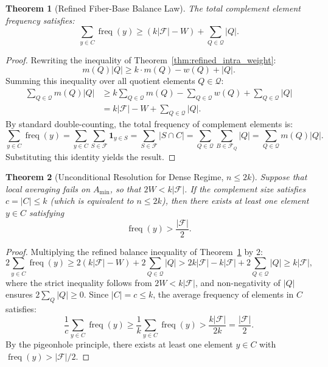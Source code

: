 \documentclass[11pt,a4paper]{article}
\theoremstyle{plain}
\newtheorem{theorem}{Theorem}[section]
\theoremstyle{definition}
\theoremstyle{remark}
\newcommand{\F}{\mathcal{F}}
\newcommand{\Q}{\mathcal{Q}}
\newcommand{\freq}{\operatorname{freq}}
\begin{document}
\begin{theorem}[Refined Fiber-Base Balance Law]\label{thm:fiber_base_balance}
The total complement element frequency satisfies:
\begin{equation}
\sum_{y \in C} \freq(y) \ge (k |\F| - W) + \sum_{Q \in \Q} |Q|.
\end{equation}
\end{theorem}
\begin{proof}
Rewriting the inequality of Theorem~\ref{thm:refined_intra_weight}:
\begin{equation}
m(Q)|Q| \ge k \cdot m(Q) - w(Q) + |Q|.
\end{equation}
Summing this inequality over all quotient elements $Q \in \Q$:
\begin{align}
\sum_{Q \in \Q} m(Q)|Q| &\ge k \sum_{Q \in \Q} m(Q) - \sum_{Q \in \Q} w(Q) + \sum_{Q \in \Q} |Q| \nonumber \\
&= k |\F| - W + \sum_{Q \in \Q} |Q|.
\end{align}
By standard double-counting, the total frequency of complement elements is:
\begin{equation}
\sum_{y \in C} \freq(y) = \sum_{y \in C} \sum_{S \in \F} \mathbf{1}_{y \in S} = \sum_{S \in \F} |S \cap C| = \sum_{Q \in \Q} \sum_{B \in \F_Q} |Q| = \sum_{Q \in \Q} m(Q)|Q|.
\end{equation}
Substituting this identity yields the result.
\end{proof}

\begin{theorem}[Unconditional Resolution for Dense Regime, $n \le 2k$]\label{thm:dense_regime}
Suppose that local averaging fails on $A_{\min}$, so that $2W < k|\F|$. If the complement size satisfies $c = |C| \le k$ (which is equivalent to $n \le 2k$), then there exists at least one element $y \in C$ satisfying
\begin{equation}
\freq(y) > \frac{|\F|}{2}.
\end{equation}
\end{theorem}
\begin{proof}
Multiplying the refined balance inequality of Theorem~\ref{thm:fiber_base_balance} by $2$:
\begin{equation}
2 \sum_{y \in C} \freq(y) \ge 2(k |\F| - W) + 2 \sum_{Q \in \Q} |Q| > 2 k |\F| - k |\F| + 2 \sum_{Q \in \Q} |Q| \ge k |\F|,
\end{equation}
where the strict inequality follows from $2W < k|\F|$, and non-negativity of $|Q|$ ensures $2\sum_Q |Q| \ge 0$. Since $|C| = c \le k$, the average frequency of elements in $C$ satisfies:
\begin{equation}
\frac{1}{c} \sum_{y \in C} \freq(y) \ge \frac{1}{k} \sum_{y \in C} \freq(y) > \frac{k |\F|}{2k} = \frac{|\F|}{2}.
\end{equation}
By the pigeonhole principle, there exists at least one element $y \in C$ with $\freq(y) > |\F|/2$.
\end{proof}
\end{document}
